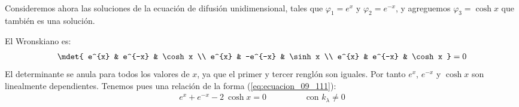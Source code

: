 \\
Consideremos ahora las soluciones de la ecuación de difusión unidimensional, tales que $\varphi_{1} = e^{x}$ y $\varphi_{2} = e^{-x}$, y agreguemos $\varphi_{3} = \cosh x$ que también es una solución. 
\par
El Wronskiano es:
\begin{align*}
\mdet{
e^{x}  & e^{-x} & \cosh x \\
e^{x}  & -e^{-x} & \sinh x \\
e^{x}  & e^{-x} & \cosh x
} = 0
\end{align*}
El determinante se anula para todos los valores de $x$, ya que el primer y tercer renglón son iguales. Por tanto $e^{x}$, $e^{-x}$ y $\cosh x$ son linealmente dependientes. Tenemos pues una relación de la forma (\ref{eq:ecuacion_09_111}):
\begin{align*}
e^{x} + e^{-x} - 2 \: \cosh x = 0 \hspace{2cm} \text{con } k_{\lambda} \neq 0
\end{align*}
